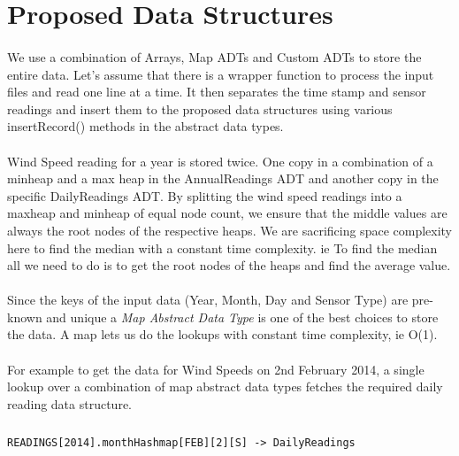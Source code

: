 \documentclass[12pt]{article}
\begin{document}
\section{Proposed Data Structures}
\paragraph{}We use a combination of Arrays, Map ADTs and Custom ADTs \cite{TEXTBOOK} to store the entire data. Let's assume that there is a wrapper function to process the input files and read one line at a time. It then separates the time stamp and sensor readings and insert them to the proposed data structures using various insertRecord() methods in the abstract data types.
\paragraph{}Wind Speed reading for a year is stored twice. One copy in a combination of a minheap and a max heap in the AnnualReadings ADT and another copy in the specific DailyReadings ADT. By splitting the wind speed readings into a maxheap and minheap of equal node count, we ensure that the middle values are always the root nodes of the respective heaps. We are sacrificing space complexity here to find the median with a constant time complexity. ie To find the median all we need to do is to get the root nodes of the heaps and find the average value.
\paragraph{}Since the keys of the input data (Year, Month, Day and Sensor Type) are pre-known and unique a {\em Map Abstract Data Type} is one of the best choices to store the data. A map lets us do the lookups with constant time complexity, ie O(1).
\paragraph{}For example to get the data for Wind Speeds on 2nd February 2014, a single lookup over a combination of map abstract data types fetches the required daily reading data structure.
\subparagraph{}
\begin{lstlisting}
READINGS[2014].monthHashmap[FEB][2][S] -> DailyReadings
\end{lstlisting}  
\end{document}
